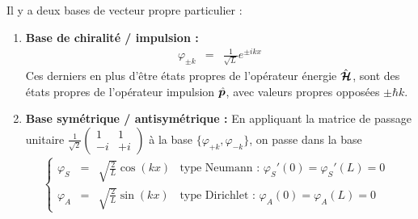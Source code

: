 \medskip
Il y a deux bases de vecteur propre particulier : 
\begin{enumerate}[label=\roman*)]
	\item {\bf Base de chiralité / impulsion :}
	\begin{eqnarray}\label{chap.1.rapel.libre.7}
		\varphi_{\pm k}   & = & \displaystyle \frac{1}{\sqrt{L}} e^{\pm ikx} 
	\end{eqnarray}
	Ces derniers en plus d'être états propres de l’opérateur énergie $\hat{\bm{\mathcal{H}}}$, sont des états propres de l’opérateur impulsion $\hat{\bm{p}}$, avec valeurs propres opposées $\pm \hbar k$.
	\item {\bf Base symétrique / antisymétrique :} En appliquant la matrice de passage unitaire  $\frac{1}{\sqrt{2}}\left (\begin{matrix}1 & 1 \\ -i & + i\end{matrix}\right)$ à la base $\{ \varphi_{+k} , \varphi_{-k} \}$, on passe dans la base    
	\begin{eqnarray}\label{chap.1.rapel.libre.8}
		\left \{ \begin{array}{rcllll} \varphi_S  & = & \displaystyle \sqrt{\frac{2}{L}} \cos (kx)  & \mbox{type Neumann  : $\varphi_S'(0) = \varphi_S'(L) = 0 $ } \\ \varphi_A   & = & \displaystyle \sqrt{\frac{2}{L}} \sin (kx)  & \mbox{type Dirichlet : $\varphi_A(0) = \varphi_A(L) = 0 $}\end{array} \right.
	\end{eqnarray}
\end{enumerate}


